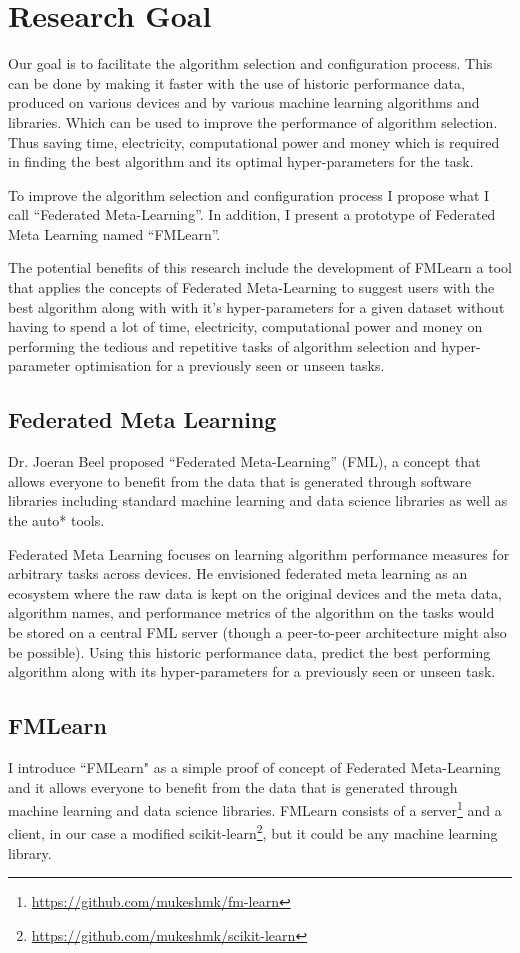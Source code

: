 \section{Research Goal}
Our goal is to facilitate the algorithm selection and configuration process. This can be done by making it faster with the use of historic performance data, produced on various devices and by various machine learning algorithms and libraries. Which can be used to improve the performance of algorithm selection. Thus saving time, electricity, computational power and money which is required in finding the best algorithm and its optimal hyper-parameters for the task.

To improve the algorithm selection and configuration process I propose what I call “Federated Meta-Learning”. In addition, I present a prototype of Federated Meta Learning named “FMLearn”.

The potential benefits of this research include the development of FMLearn a tool that applies the concepts of Federated Meta-Learning to suggest users with the best algorithm along with with it's hyper-parameters for a given dataset without having to spend a lot of time, electricity, computational power and money on performing the tedious and repetitive tasks of algorithm selection and hyper-parameter optimisation for a previously seen or unseen tasks.

\subsection{Federated Meta Learning}
Dr. Joeran Beel proposed “Federated Meta-Learning” (FML), a concept that allows everyone to benefit from the data that is generated through software libraries including standard machine learning and data science libraries as well as the auto* tools. 

Federated Meta Learning focuses on learning algorithm performance measures for arbitrary tasks across devices. He envisioned federated meta learning as an ecosystem where the raw data is kept on the original  devices and the meta data, algorithm names, and performance metrics of the algorithm on the tasks would be stored on a central FML server (though a peer-to-peer architecture might also be possible). Using this historic performance data, predict the best performing algorithm along with its hyper-parameters for a previously seen or unseen task.

\subsection{FMLearn}
I introduce “FMLearn" as a simple proof of concept of Federated Meta-Learning and it allows everyone to benefit from the data that is generated through machine learning and data science libraries. FMLearn consists of a server\footnote{\url{https://github.com/mukeshmk/fm-learn}} and a client, in our case a modified scikit-learn\footnote{\url{https://github.com/mukeshmk/scikit-learn}}, but it could be any machine learning library.

